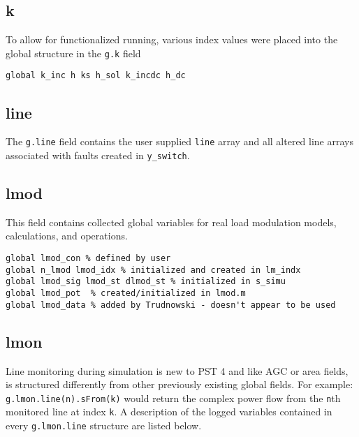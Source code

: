 \subsection{k}  
To allow for functionalized running, various index values were placed into the global structure in the \verb|g.k| field

\begin{verbatim}
global k_inc h ks h_sol k_incdc h_dc
\end{verbatim}

\subsection{line}  
The \verb|g.line| field contains the user supplied \verb|line| array and all altered line arrays associated with faults created in \verb|y_switch|.

\subsection{lmod}
This field contains collected global variables for real load modulation models, calculations, and operations.
\begin{verbatim}
global lmod_con % defined by user
global n_lmod lmod_idx % initialized and created in lm_indx
global lmod_sig lmod_st dlmod_st % initialized in s_simu
global lmod_pot  % created/initialized in lmod.m 
global lmod_data % added by Trudnowski - doesn't appear to be used
\end{verbatim}

\subsection{lmon}  
Line monitoring during simulation is new to PST 4 and like AGC or area fields, is structured  differently from other previously existing global fields.
For example:\\ \verb|g.lmon.line(n).sFrom(k)| would return the complex power flow from the \verb|n|th monitored line at index \verb|k|.
A description of the logged variables contained in every \verb|g.lmon.line| structure are listed below.

